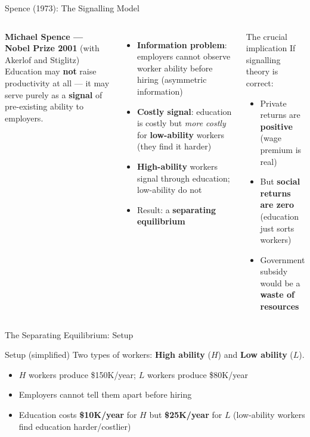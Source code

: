 \documentclass[aspectratio=169, 12pt]{beamer}
\begin{document}
\begin{frame}{Spence (1973): The Signalling Model}
  \begin{columns}
      \footnotesize \textbf{Michael Spence --- Nobel Prize 2001} (with Akerlof and Stiglitz)\\[0.2em]
      Education may \textbf{not} raise productivity at all --- it may serve purely as a
      \textbf{signal} of pre-existing ability to employers.
      \begin{itemize}
        \item \textbf{Information problem}: employers cannot observe worker ability before
              hiring (asymmetric information)
        \item \textbf{Costly signal}: education is costly but \emph{more costly} for
              \textbf{low-ability} workers (they find it harder)
        \item \textbf{High-ability} workers signal through education; low-ability do not
        \item Result: a \textbf{separating equilibrium}
      \end{itemize}
      \begin{alertblock}{The crucial implication}
        \footnotesize If signalling theory is correct:
        \begin{itemize}
          \item Private returns are \textbf{positive} (wage premium is real)
          \item But \textbf{social returns are zero} (education just sorts workers)
          \item Government subsidy would be a \textbf{waste of resources}
        \end{itemize}
      \end{alertblock}
  \end{columns}
\end{frame}

\begin{frame}{The Separating Equilibrium: Setup}
  \begin{block}{Setup (simplified)}
    \small Two types of workers: \textbf{High ability} ($H$) and \textbf{Low ability} ($L$).
    \begin{itemize}
      \item $H$ workers produce \$150K/year; $L$ workers produce \$80K/year
      \item Employers cannot tell them apart before hiring
      \item Education costs \textbf{\$10K/year} for $H$ but \textbf{\$25K/year} for $L$
            (low-ability workers find education harder/costlier)
    \end{itemize}
  \end{block}
\end{frame}
\end{document}
